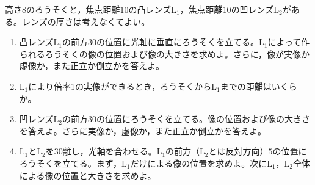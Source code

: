 \hakosyokika
\item 高さ$8$のろうそくと，焦点距離$10$の凸レンズ$\mathrm{L_1}$，焦点距離$10$の凹レンズ$\mathrm{L_2}$がある。レンズの厚さは考えなくてよい。
        \begin{enumerate}
            \item 凸レンズ$\mathrm{L_1}$の前方$30$の位置に光軸に垂直にろうそくを立てる。$\mathrm{L_1}$によって作られるろうそくの像の位置および像の大きさを求めよ。さらに，像が実像か虚像か，また正立か倒立かを答えよ。
            \item $\mathrm{L_1}$により倍率1の実像ができるとき，ろうそくから$\mathrm{L_1}$までの距離はいくらか。
            \item 凹レンズ$\mathrm{L_2}$の前方$30$の位置にろうそくを立てる。像の位置および像の大きさを答えよ。さらに実像か，虚像か，また正立か倒立かを答えよ。
            \item $\mathrm{L_1}$と$\mathrm{L_2}$を$30$離し，光軸を合わせる。$\mathrm{L_1}$の前方（$\mathrm{L_2}$とは反対方向）$5$の位置にろうそくを立てる。まず，$\mathrm{L_1}$だけによる像の位置を求めよ。次に$\mathrm{L_1}$，$\mathrm{L_2}$全体による像の位置と大きさを求めよ。
        \end{enumerate}